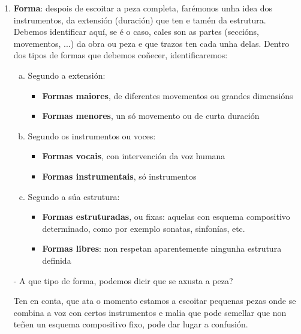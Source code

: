 \begin{enumerate}[1.-]
%
        \item %
        \textbf{Forma}: despois de escoitar a peza completa, farémonos unha idea dos instrumentos, da extensión (duración) que ten e tamén da estrutura. Debemos identificar aquí, se é o caso, cales son as partes (seccións, movementos, ...) da obra ou peza e que trazos ten cada unha delas. Dentro dos tipos de formas que debemos coñecer, identificaremos:
            \begin{enumerate}[a)]
                \item
                Segundo a extensión:
                \begin{itemize}
                    \item
                    \textbf{Formas maiores}, de diferentes movementos ou grandes dimensións
                    \item
                    \textbf{Formas menores}, un só movemento ou de curta duración
                \end{itemize}
                \item
                Segundo os instrumentos ou voces:
                 \begin{itemize}
                    \item
                    \textbf{Formas vocais}, con intervención da voz humana
                    \item
                    \textbf{Formas instrumentais}, só instrumentos
                \end{itemize}
                \item 
                Segundo a súa estrutura:
                \begin{itemize}
                    \item 
                    \textbf{Formas estruturadas}, ou fixas: aquelas con esquema compositivo determinado, como por exemplo sonatas, sinfonías, etc.
                    \item
                    \textbf{Formas libres}: non respetan aparentemente ningunha estrutura definida
                \end{itemize}
            \end{enumerate}
        \par %
        - A que tipo de forma, podemos dicir que se axusta a peza? \dotfill
        \par %
        Ten en conta, que ata o momento estamos a escoitar pequenas pezas onde se combina a voz con certos instrumentos e malia que pode semellar que non teñen un esquema compositivo fixo, pode dar lugar a confusión.    
        \end{enumerate}
%
